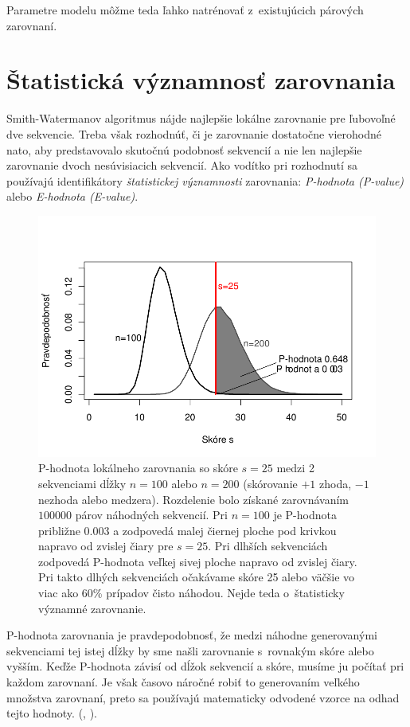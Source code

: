 Parametre modelu môžme teda ľahko natrénovať z~existujúcich párových zarovnaní.

\section[Štat. významnosť ]{Štatistická významnosť zarovnania}
Smith-Watermanov algoritmus nájde najlepšie lokálne zarovnanie pre ľubovoľné dve sekvencie. Treba však rozhodnúť, či je zarovnanie dostatočne vierohodné nato, aby predstavovalo skutočnú podobnosť sekvencií a nie len najlepšie zarovnanie dvoch nesúvisiacich sekvencií.
Ako vodítko pri rozhodnutí sa používajú identifikátory \textit{štatistickej významnosti} zarovnania: \textit{P-hodnota (P-value)} alebo \textit{E-hodnota (E-value)}.

\begin{figure}[htp]
    \centering
    \includegraphics[width=.9\textwidth]{images/p-value}
    \caption[P-hodnota lokálneho zarovnania]{P-hodnota lokálneho zarovnania so skóre $s = 25$ medzi 2 sekvenciami dĺžky $n = 100$ alebo $n = 200$ (skórovanie $+1$ zhoda, $-1$ nezhoda alebo medzera). Rozdelenie bolo získané zarovnávaním $100000$ párov náhodných sekvencií. Pri $n=100$ je P-hodnota približne 0.003 a zodpovedá malej čiernej ploche pod krivkou napravo od zvislej čiary pre $s=25$. Pri dlhších sekvenciách zodpovedá P-hodnota veľkej sivej ploche napravo od zvislej čiary. Pri takto dlhých sekvenciách očakávame skóre 25 alebo väčšie vo viac ako 60\% prípadov čisto náhodou. Nejde teda o~štatisticky významné zarovnanie.}
    \label{fig:p-value}
\end{figure}

P-hodnota zarovnania je pravdepodobnosť, že medzi náhodne generovanými sekvenciami tej istej dĺžky by sme našli zarovnanie s~rovnakým skóre alebo vyšším. Keďže P-hodnota závisí od dĺžok sekvencií a skóre, musíme ju počítať pri každom zarovnaní. Je však časovo náročné robiť to generovaním veľkého množstva zarovnaní, preto sa používajú matematicky odvodené vzorce na odhad tejto hodnoty. (\cite{Karlin}, \cite{Mitrophanov}).

